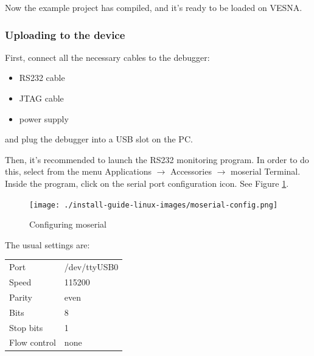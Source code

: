 \documentclass[a4paper, 10pt]{article}
\begin{document}
Now the example project has compiled, and it's ready to be loaded on VESNA.

\subsubsection{Uploading to the device}

First, connect all the necessary cables to the debugger:
    \begin{itemize}
    \item RS232 cable
    \item JTAG cable
    \item power supply
    \end{itemize}
and plug the debugger into a USB slot on the PC.

Then, it's recommended to launch the RS232 monitoring program.
In order to do this, select from the menu
Applications $\rightarrow$ Accessories $\rightarrow$ moserial Terminal.
Inside the program, click on the serial port configuration icon.
See Figure \ref{fig:moserial-config}.

    \begin{figure}[H]
    \centering
        \texttt{[image: ./install-guide-linux-images/moserial-config.png]}
        \caption{Configuring moserial}
        \label{fig:moserial-config}
    \end{figure}


The usual settings are:

    \smallskip
    \begin{tabular}{ l l }
    Port         & /dev/ttyUSB0 \\
    Speed        & 115200       \\
    Parity       & even         \\
    Bits         & 8            \\
    Stop bits    & 1            \\
    Flow control & none         \\
    \end{tabular}
    \smallskip
\end{document}
